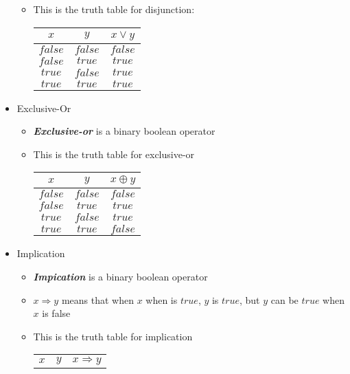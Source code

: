 \documentclass{article}
\begin{document}
\begin{itemize}
\begin{itemize}
    \item{This is the truth table for disjunction:} \\
    \begin{center}
      \begin{tabular}{ |c|c|c| }
        \hline
        $x$ & $y$ & $x \lor y$ \\
        \hline
        $false$ & $false$ & $false$ \\
        $false$ & $true$ & $true$ \\
        $true$ & $false$ & $true$ \\
        $true$ & $true$ & $true$ \\
        \hline
      \end{tabular}
    \end{center}
  \end{itemize}
  \item{Exclusive-Or}
  \begin{itemize}
    \item{\textbf{\textit{Exclusive-or}} is a binary boolean operator}
    \item{This is the truth table for exclusive-or} \\
    \begin{center}
      \begin{tabular}{ |c|c|c| }
        \hline
        $x$ & $y$ & $x \oplus y$ \\
        \hline
        $false$ & $false$ & $false$ \\
        $false$ & $true$ & $true$ \\
        $true$ & $false$ & $true$ \\
        $true$ & $true$ & $false$ \\
        \hline
      \end{tabular}
    \end{center}
  \end{itemize}
  \item{Implication}
  \begin{itemize}
    \item{\textbf{\textit{Impication}} is a binary boolean operator}
    \item{$x \Rightarrow y$ means that when $x$ when is $true$, $y$ is $true$, but $y$ can be $true$ when $x$ is false}
    \item{This is the truth table for implication}
    \begin{center}
      \begin{tabular}{ |c|c|c| }
        \hline
        $x$ & $y$ & $x \Rightarrow y$ \\

\end{tabular}
\end{center}
\end{itemize}
\end{itemize}
\end{document}
